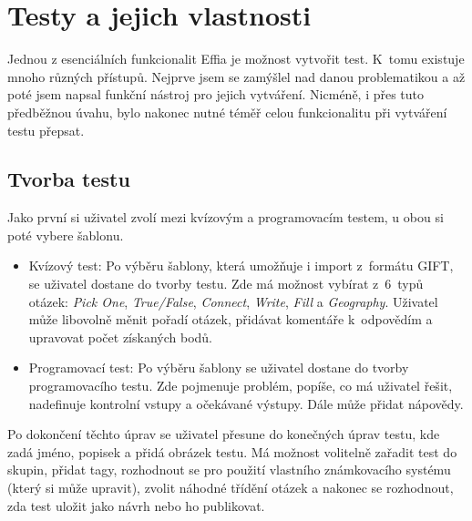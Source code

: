\documentclass[12pt, a4paper,
openright
]{report}
\begin{document}
\section{Testy a jejich vlastnosti}
Jednou z esenciálních funkcionalit Effia je možnost vytvořit test. K~tomu existuje mnoho různých přístupů. Nejprve jsem se zamýšlel nad danou problematikou a až poté jsem napsal funkční nástroj pro jejich vytváření. Nicméně, i přes tuto předběžnou úvahu, bylo nakonec nutné téměř celou funkcionalitu při vytváření testu přepsat.

\subsection{Tvorba testu}
\label{subsec:creation}
Jako první si uživatel zvolí mezi kvízovým a programovacím testem, u obou si poté vybere šablonu.
\begin{itemize}
	\item Kvízový test: Po výběru šablony, která umožňuje i import z~formátu GIFT, se uživatel dostane do tvorby testu. Zde má možnost vybírat z~6~typů otázek: \textit{Pick One}, \textit{True/False}, \textit{Connect}, \textit{Write}, \textit{Fill} a \textit{Geography}. Uživatel může libovolně měnit pořadí otázek, přidávat komentáře k~odpovědím a upravovat počet získaných bodů.
	\item Programovací test: Po výběru šablony se uživatel dostane do tvorby programovacího testu. Zde pojmenuje problém, popíše, co má uživatel řešit, nadefinuje kontrolní vstupy a očekávané výstupy. Dále může přidat nápovědy.
\end{itemize}
Po dokončení těchto úprav se uživatel přesune do konečných úprav testu, kde zadá jméno, popisek a přidá obrázek testu. Má možnost volitelně zařadit test do skupin, přidat tagy, rozhodnout se pro použití vlastního známkovacího systému (který si může upravit), zvolit náhodné třídění otázek a nakonec se rozhodnout, zda test uložit jako návrh nebo ho publikovat.
\end{document}
